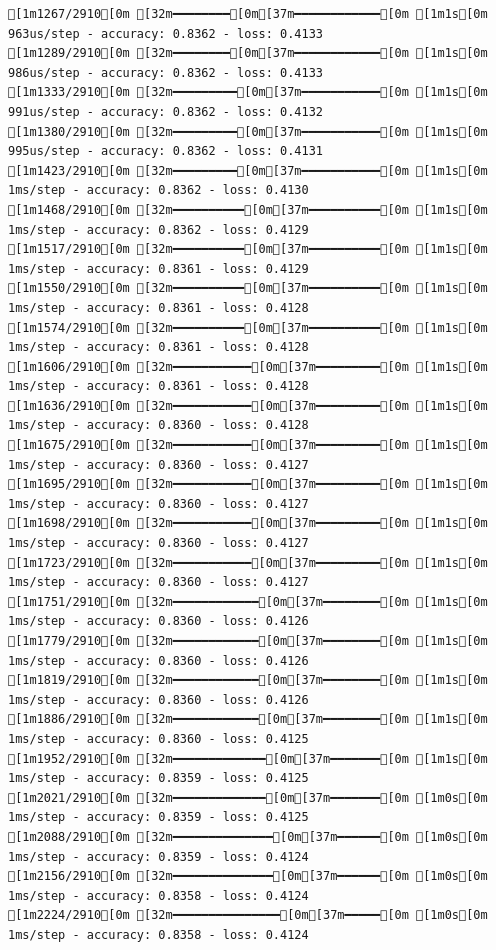 \documentclass[
  letterpaper,
  DIV=11,
  numbers=noendperiod]{scrartcl}
\begin{document}
\begin{verbatim}
[1m1267/2910[0m [32m━━━━━━━━[0m[37m━━━━━━━━━━━━[0m [1m1s[0m 963us/step - accuracy: 0.8362 - loss: 0.4133
[1m1289/2910[0m [32m━━━━━━━━[0m[37m━━━━━━━━━━━━[0m [1m1s[0m 986us/step - accuracy: 0.8362 - loss: 0.4133
[1m1333/2910[0m [32m━━━━━━━━━[0m[37m━━━━━━━━━━━[0m [1m1s[0m 991us/step - accuracy: 0.8362 - loss: 0.4132
[1m1380/2910[0m [32m━━━━━━━━━[0m[37m━━━━━━━━━━━[0m [1m1s[0m 995us/step - accuracy: 0.8362 - loss: 0.4131
[1m1423/2910[0m [32m━━━━━━━━━[0m[37m━━━━━━━━━━━[0m [1m1s[0m 1ms/step - accuracy: 0.8362 - loss: 0.4130  
[1m1468/2910[0m [32m━━━━━━━━━━[0m[37m━━━━━━━━━━[0m [1m1s[0m 1ms/step - accuracy: 0.8362 - loss: 0.4129
[1m1517/2910[0m [32m━━━━━━━━━━[0m[37m━━━━━━━━━━[0m [1m1s[0m 1ms/step - accuracy: 0.8361 - loss: 0.4129
[1m1550/2910[0m [32m━━━━━━━━━━[0m[37m━━━━━━━━━━[0m [1m1s[0m 1ms/step - accuracy: 0.8361 - loss: 0.4128
[1m1574/2910[0m [32m━━━━━━━━━━[0m[37m━━━━━━━━━━[0m [1m1s[0m 1ms/step - accuracy: 0.8361 - loss: 0.4128
[1m1606/2910[0m [32m━━━━━━━━━━━[0m[37m━━━━━━━━━[0m [1m1s[0m 1ms/step - accuracy: 0.8361 - loss: 0.4128
[1m1636/2910[0m [32m━━━━━━━━━━━[0m[37m━━━━━━━━━[0m [1m1s[0m 1ms/step - accuracy: 0.8360 - loss: 0.4128
[1m1675/2910[0m [32m━━━━━━━━━━━[0m[37m━━━━━━━━━[0m [1m1s[0m 1ms/step - accuracy: 0.8360 - loss: 0.4127
[1m1695/2910[0m [32m━━━━━━━━━━━[0m[37m━━━━━━━━━[0m [1m1s[0m 1ms/step - accuracy: 0.8360 - loss: 0.4127
[1m1698/2910[0m [32m━━━━━━━━━━━[0m[37m━━━━━━━━━[0m [1m1s[0m 1ms/step - accuracy: 0.8360 - loss: 0.4127
[1m1723/2910[0m [32m━━━━━━━━━━━[0m[37m━━━━━━━━━[0m [1m1s[0m 1ms/step - accuracy: 0.8360 - loss: 0.4127
[1m1751/2910[0m [32m━━━━━━━━━━━━[0m[37m━━━━━━━━[0m [1m1s[0m 1ms/step - accuracy: 0.8360 - loss: 0.4126
[1m1779/2910[0m [32m━━━━━━━━━━━━[0m[37m━━━━━━━━[0m [1m1s[0m 1ms/step - accuracy: 0.8360 - loss: 0.4126
[1m1819/2910[0m [32m━━━━━━━━━━━━[0m[37m━━━━━━━━[0m [1m1s[0m 1ms/step - accuracy: 0.8360 - loss: 0.4126
[1m1886/2910[0m [32m━━━━━━━━━━━━[0m[37m━━━━━━━━[0m [1m1s[0m 1ms/step - accuracy: 0.8360 - loss: 0.4125
[1m1952/2910[0m [32m━━━━━━━━━━━━━[0m[37m━━━━━━━[0m [1m1s[0m 1ms/step - accuracy: 0.8359 - loss: 0.4125
[1m2021/2910[0m [32m━━━━━━━━━━━━━[0m[37m━━━━━━━[0m [1m0s[0m 1ms/step - accuracy: 0.8359 - loss: 0.4125
[1m2088/2910[0m [32m━━━━━━━━━━━━━━[0m[37m━━━━━━[0m [1m0s[0m 1ms/step - accuracy: 0.8359 - loss: 0.4124
[1m2156/2910[0m [32m━━━━━━━━━━━━━━[0m[37m━━━━━━[0m [1m0s[0m 1ms/step - accuracy: 0.8358 - loss: 0.4124
[1m2224/2910[0m [32m━━━━━━━━━━━━━━━[0m[37m━━━━━[0m [1m0s[0m 1ms/step - accuracy: 0.8358 - loss: 0.4124

\end{verbatim}
\end{document}

